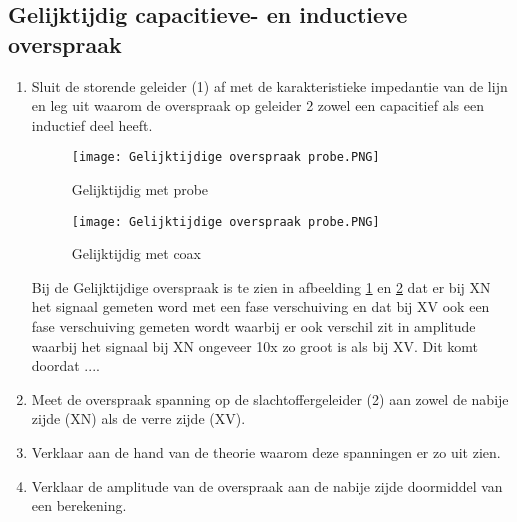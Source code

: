 \newpage

\subsection{Gelijktijdig capacitieve- en inductieve overspraak}
\begin{enumerate}
    \item Sluit de storende geleider (1) af met de karakteristieke impedantie van de lijn en leg uit
    waarom de overspraak op geleider 2 zowel een capacitief als een inductief deel heeft.

    \begin{figure}[H]
        \centering
        \texttt{[image: Gelijktijdige overspraak probe.PNG]}
        \caption{Gelijktijdig met probe}
        \label{fig:Gelijktijdig met probe}
    \end{figure}

    \begin{figure}[H]
        \centering
        \texttt{[image: Gelijktijdige overspraak probe.PNG]}
        \caption{Gelijktijdig met coax}
        \label{fig:Gelijktijdig met coax}
    \end{figure}

    Bij de Gelijktijdige overspraak is te zien in afbeelding \ref{fig:Gelijktijdig met probe} en \ref{fig:Gelijktijdig met coax} dat er bij XN het signaal gemeten word met een fase verschuiving en dat bij XV ook een fase verschuiving gemeten wordt waarbij er ook verschil zit in amplitude waarbij het signaal bij XN ongeveer 10x zo groot is als bij XV. Dit komt doordat ....

    \item Meet de overspraak spanning op de slachtoffergeleider (2) aan zowel de nabije zijde (XN) als de verre zijde (XV).

    \item Verklaar aan de hand van de theorie waarom deze spanningen er zo uit zien.
    
    \item Verklaar de amplitude van de overspraak aan de nabije zijde doormiddel van een berekening.
    

\end{enumerate}
